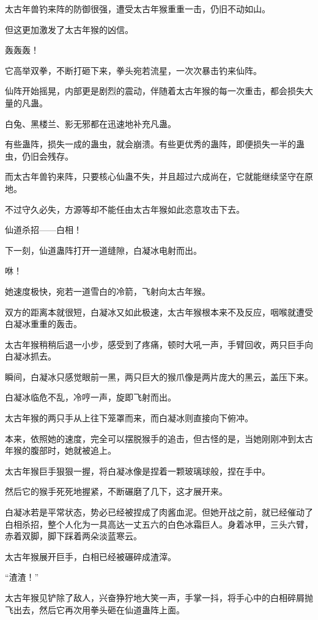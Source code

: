 
\begin{this_body}

太古年兽钓来阵的防御很强，遭受太古年猴重重一击，仍旧不动如山。

但这更加激发了太古年猴的凶信。

轰轰轰！

它高举双拳，不断打砸下来，拳头宛若流星，一次次暴击钓来仙阵。

仙阵开始摇晃，内部更是剧烈的震动，伴随着太古年猴的每一次重击，都会损失大量的凡蛊。

白兔、黑楼兰、影无邪都在迅速地补充凡蛊。

有些蛊阵，损失一成的蛊虫，就会崩溃。有些更优秀的蛊阵，即便损失一半的蛊虫，仍旧会残存。

而太古年兽钓来阵，只要核心仙蛊不失，并且超过六成尚在，它就能继续坚守在原地。

不过守久必失，方源等却不能任由太古年猴如此恣意攻击下去。

仙道杀招——白相！

下一刻，仙道蛊阵打开一道缝隙，白凝冰电射而出。

咻！

她速度极快，宛若一道雪白的冷箭，飞射向太古年猴。

双方的距离本就很短，白凝冰又如此极速，太古年猴根本来不及反应，咽喉就遭受白凝冰重重的轰击。

太古年猴稍稍后退一小步，感受到了疼痛，顿时大吼一声，手臂回收，两只巨手向白凝冰抓去。

瞬间，白凝冰只感觉眼前一黑，两只巨大的猴爪像是两片庞大的黑云，盖压下来。

白凝冰临危不乱，冷哼一声，旋即飞射而出。

太古年猴的两只手从上往下笼罩而来，而白凝冰则直接向下俯冲。

本来，依照她的速度，完全可以摆脱猴手的追击，但古怪的是，当她刚刚冲到太古年猴的腹部时，她就被追上。

太古年猴巨手狠狠一握，将白凝冰像是捏着一颗玻璃球般，捏在手中。

然后它的猴手死死地握紧，不断碾磨了几下，这才展开来。

白凝冰若是平常状态，势必已经被捏成了肉酱血泥。但她开战之前，就已经催动了白相杀招，整个人化为一具高达一丈五六的白色冰霜巨人。身着冰甲，三头六臂，赤着双脚，脚下踩着两朵淡蓝寒云。

太古年猴展开巨手，白相已经被碾碎成渣滓。

“渣渣！”

太古年猴见铲除了敌人，兴奋狰狞地大笑一声，手掌一抖，将手心中的白相碎屑抛飞出去，然后它再次用拳头砸在仙道蛊阵上面。


\end{this_body}
